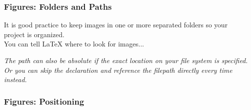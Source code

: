 \begin{frame}[fragile]
\frametitle{Figures: Folders and Paths}
It is good practice to keep images in one or more separated folders so your project is organized.\\ \pause
You can tell \LaTeX{} where to look for images... \pause
{} \pause
{} \pause
\small \textit{The path can also be \emph{absolute} if the exact location on your file system is specified.} \\ \pause
\textit{Or you can skip the declaration and reference the filepath directly every time instead.}
\end{frame}


\begin{frame}[fragile]
\frametitle{Figures: Positioning}

\end{frame}


